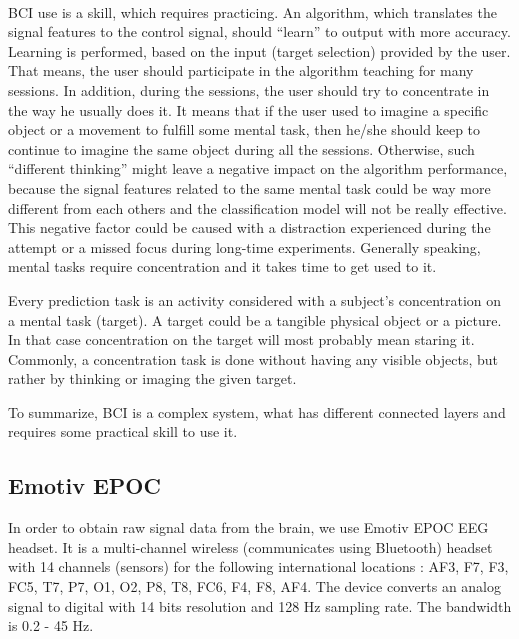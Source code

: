\documentclass[12pt]{article}
\theoremstyle{definition}
\begin{document}
\paragraph{}
BCI use is a skill, which requires practicing. An algorithm, which translates the signal features to the control signal, should ``learn'' to output with more accuracy. Learning is performed, based on the input (target selection) provided by the user. That means, the user should participate in the algorithm teaching for many sessions. In addition, during the sessions, the user should try to concentrate in the way he usually does it. It means that if the user used to imagine a specific object or a movement to fulfill some mental task, then he/she should keep to continue to imagine the same object during all the sessions. Otherwise, such ``different thinking'' might leave a negative impact on the algorithm performance, because the signal features related to the same mental task could be way more different from each others and the classification model will not be really effective. This negative factor could be caused with a distraction experienced during the attempt or a missed focus during long-time experiments. Generally speaking, mental tasks require concentration and it takes time to get used to it.

Every prediction task is an activity considered with a subject's concentration on a mental task (target). A target could be a tangible physical object or a picture. In that case concentration on the target will most probably mean staring it. Commonly, a concentration task is done without having any visible objects, but rather by thinking or imaging the given target.

To summarize, BCI is a complex system, what has different connected layers and requires some practical skill to use it.
\subsection{Emotiv EPOC}

In order to obtain raw signal data from the brain, we use Emotiv EPOC EEG headset. It is a multi-channel wireless (communicates using Bluetooth) headset with 14 channels (sensors) for the following international locations \cite{emotiv}: AF3, F7, F3, FC5, T7, P7, O1, O2, P8, T8, FC6, F4, F8, AF4. The device converts an analog signal to digital with 14 bits resolution and 128 Hz sampling rate. The bandwidth is 0.2 - 45 Hz. \cite{emotiv}
\end{document}
